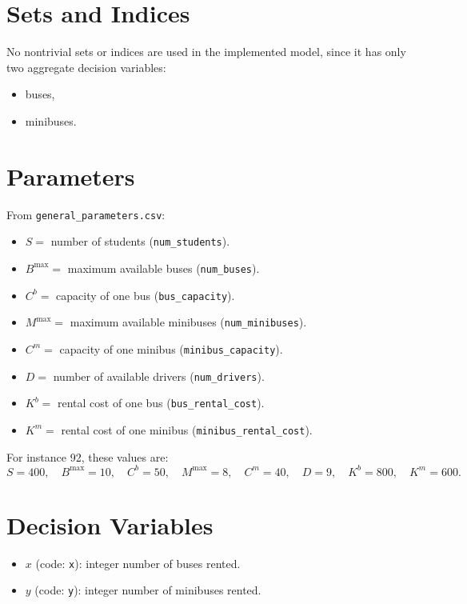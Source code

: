 \section*{Sets and Indices}

No nontrivial sets or indices are used in the implemented model, since it has only two aggregate decision variables:
\begin{itemize}
    \item buses,
    \item minibuses.
\end{itemize}

\section*{Parameters}

From \texttt{general\_parameters.csv}:
\begin{itemize}
    \item $S =$ number of students (\texttt{num\_students}).
    \item $B^{\max} =$ maximum available buses (\texttt{num\_buses}).
    \item $C^b =$ capacity of one bus (\texttt{bus\_capacity}).
    \item $M^{\max} =$ maximum available minibuses (\texttt{num\_minibuses}).
    \item $C^m =$ capacity of one minibus (\texttt{minibus\_capacity}).
    \item $D =$ number of available drivers (\texttt{num\_drivers}).
    \item $K^b =$ rental cost of one bus (\texttt{bus\_rental\_cost}).
    \item $K^m =$ rental cost of one minibus (\texttt{minibus\_rental\_cost}).
\end{itemize}

For instance 92, these values are:
\[
S=400,\quad
B^{\max}=10,\quad
C^b=50,\quad
M^{\max}=8,\quad
C^m=40,\quad
D=9,\quad
K^b=800,\quad
K^m=600.
\]

\section*{Decision Variables}

\begin{itemize}
    \item $x$ (code: \texttt{x}): integer number of buses rented.
    \item $y$ (code: \texttt{y}): integer number of minibuses rented.
\end{itemize}

